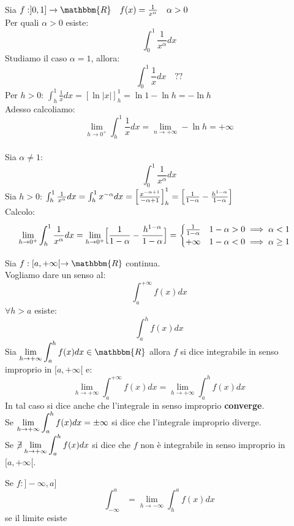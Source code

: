 \documentclass[12pt]{report}
\begin{document}
		\begin{example}{}{}
			Sia $f: ]0, 1] \to \mathbbm{R} \quad f(x) = \frac{1}{x^\alpha} \quad \alpha > 0$ \\
			Per quali $\alpha > 0$ esiste:
			\[
			\int_{0}^{1}\frac{1}{x^\alpha}dx
			\]
			Studiamo il caso $\alpha = 1$, allora:
			\[
			\int_{0}^{1}\frac{1}{x}dx \quad ??
			\]
			Per $h > 0$: $\int_{h}^{1}\frac{1}{x}dx = [\ln|x|]^1_h = \ln 1 - \ln h = -\ln h$ \\
			Adesso calcoliamo:
			\[
			\lim_{h \to {0^+}}\int_{h}^{1}\frac{1}{x}dx = \lim_{n \to +\infty}-\ln h = +\infty
			\] \\
			Sia $\alpha \neq 1$:
			\[
			\int_{0}^{1}\frac{1}{x^\alpha}dx
			\]
			Sia $h > 0$: $\int_{h}^{1}\frac{1}{x^\alpha}dx = \int_{h}^{1}x^{-\alpha}dx = \Bigl[ \frac{x^{-\alpha + 1}}{-\alpha + 1}\Bigr]^{1}_h = \Bigl[ \frac{1}{1-\alpha} - \frac{h^{1 - \alpha}}{1 -\alpha}\Bigr]$ \\
			Calcolo: \\
			\[
			\lim_{h \to {0^+}}\int_{h}^{1}\frac{1}{x^\alpha}dx = \lim_{h \to {0^+}}\Bigl[ \frac{1}{1-\alpha} - \frac{h^{1 - \alpha}}{1 -\alpha}\Bigr] = \begin{cases}
				\frac{1}{1-\alpha} \quad 1-\alpha > 0 \implies \alpha< 1 \\
				+\infty \quad 1-\alpha<0 \implies \alpha \geq 1
			\end{cases}
			\]
		\end{example}
		Sia $f: [a, +\infty[ \to \mathbbm{R}$ continua. \\
		Vogliamo dare un senso al:
		\[
		\int_{a}^{+\infty}f(x)dx
		\]
		$\forall h > a$ esiste:
		\[
		\int_{a}^{h}f(x)dx
		\]
		Sia $\mathlarger{\lim_{h \to +\infty}\int_{a}^{h}f(x)dx} \in \mathbbm{R}$ allora $f$ si dice integrabile in senso improprio in $[a, +\infty[$ e:
			\[
			\lim_{h \to +\infty}\int_{a}^{+\infty}f(x)dx = \lim_{h \to +\infty}\int_{a}^{h}f(x)dx
			\]
		In tal caso si dice anche che l'integrale in senso improprio \textbf{converge}. \\
		Se $\mathlarger{\lim_{h \to +\infty}\int_{a}^{h}f(x)dx = \pm\infty}$ si dice che l'integrale improprio diverge. \\
		Se $\centernot{\exists}\mathlarger{\lim_{h \to +\infty }\int_{a}^{h}f(x)dx}$ si dice che $f$ non è integrabile in senso improprio in $[a, +\infty[$. \\
		\begin{note}{}{}
			Se $f: ]-\infty, a]$
			\[
			\int_{-\infty}^{a} = \lim_{h \to -\infty}\int_{h}^{a}f(x)dx
			\]
			se il limite esiste
		\end{note}
\end{document}
